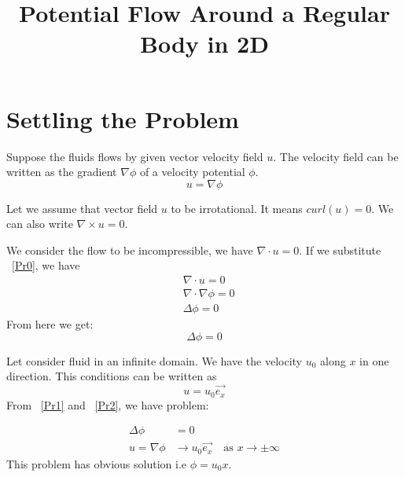 \documentclass[a4paper,12pt]{article}
\title{Potential Flow Around a Regular Body in 2D}
\author{}
\date{}
\begin{document}
\maketitle
\section{Settling the Problem}

Suppose the fluids flows by given vector velocity field $u$. The velocity field can be written as the gradient 
$\nabla \phi$ of a velocity potential $\phi$. 
\begin{equation}\label{Pr0}
 u=\nabla \phi
\end{equation}

Let we assume that vector field $u$ to be irrotational. It means 
$curl(u)=0$. We can also write
$\nabla\times u=0$.

We consider the flow to be incompressible, we have $\nabla\cdot u=0$. If we substitute ~\eqref{Pr0}, we have
\begin{align*}
&\nabla \cdot u=0 \\
 &\nabla \cdot \nabla\phi=0 \\
 &\Delta \phi=0
\end{align*}
From here we get:
\begin{equation} \label{Pr1}
 \Delta \phi=0
\end{equation}

Let consider fluid in an infinite domain. We have the velocity $u_0$ along $x$ in one direction.  This conditions can be written as
\begin{equation} \label{Pr2}
u=u_0\vec{e_x}
\end{equation}
From ~\eqref{Pr1} and ~\eqref{Pr2}, we have problem:


\begin{equation} \label{problem1}
\begin{split}
\Delta \phi &=0\\
u=\nabla \phi &\to u_0 \vec{e_x} \quad \text{as } x\to\pm\infty
\end{split}
\end{equation}
This problem has obvious solution i.e $\phi= u_0 x$.
\end{document}
